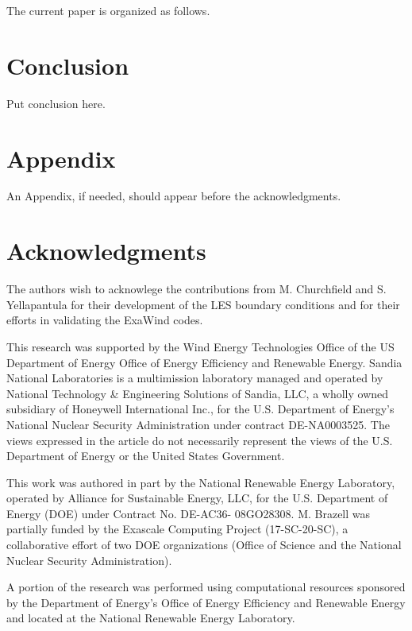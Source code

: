 \documentclass[conf]{new-aiaa}
\begin{document}
The current paper is organized as follows.





\section{Conclusion}
Put conclusion here.

\section*{Appendix}

An Appendix, if needed, should appear before the acknowledgments.

\section*{Acknowledgments}

The authors wish to acknowlege the contributions from M. Churchfield
and S. Yellapantula for their development of the LES boundary
conditions and for their efforts in validating the ExaWind codes.

This research was supported by the Wind Energy Technologies Office of
the US Department of Energy Office of Energy Efficiency and Renewable
Energy.  Sandia National Laboratories is a multimission laboratory
managed and operated by National Technology \& Engineering Solutions
of Sandia, LLC, a wholly owned subsidiary of Honeywell International
Inc., for the U.S. Department of Energy's National Nuclear Security
Administration under contract DE-NA0003525. The views expressed in the
article do not necessarily represent the views of the U.S. Department
of Energy or the United States Government.

This work was authored in part by the National Renewable Energy
Laboratory, operated by Alliance for Sustainable Energy, LLC, for the
U.S. Department of Energy (DOE) under Contract No. DE-AC36-
08GO28308. M. Brazell was partially funded by the Exascale Computing
Project (17-SC-20-SC), a collaborative effort of two DOE organizations
(Office of Science and the National Nuclear Security Administration).

A portion of the research was performed using computational
resources sponsored by the Department of Energy's Office of Energy
Efficiency and Renewable Energy and located at the National Renewable
Energy Laboratory.


\end{document}
